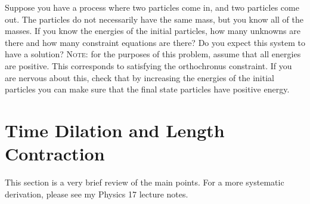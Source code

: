 \documentclass[12pt, oneside]{report}    %
\let\oldsection\section
\def\section{%
  \setcounter{sidenote}{1}%
  \oldsection
}
\begin{document}
\begin{exercise}
Suppose you have a process where two particles come in, and two particles come out. The particles do not necessarily have the same mass, but you know all of the masses. If you know the energies of the initial particles, how many unknowns are there and how many constraint equations are there? Do you expect this system to have a solution? \textsc{Note}: for the purposes of this problem, assume that all energies are positive. This corresponds to satisfying the orthochronus constraint. If you are nervous about this, check that by increasing the energies of the initial particles you can make sure that the final state particles have positive energy. 
\end{exercise}


\section{Time Dilation and Length Contraction}

\begin{flipcomment}
This section is a very brief review of the main points. For a more systematic derivation, please see my Physics 17 lecture notes. 
\end{flipcomment}
\end{document}
